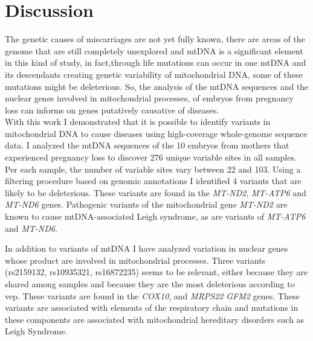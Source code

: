 \chapter{Discussion}
The genetic causes of miscarriages are not yet fully known, there are areas of the genome that are still completely unexplored and  mtDNA is a significant element in this kind of study, in fact,through life mutations can occur in one mtDNA and its descendants creating genetic variability of mitochondrial DNA, some of these mutations might be deleterious. So, the analysis of the mtDNA sequences and the nuclear genes involved in mitochondrial processes, of embryos from pregnancy loss can informs on genes putatively causative of diseases. \\

With this work I demonstrated that it is possible to identify variants in mitochondrial DNA to cause diseases using high-coverage whole-genome sequence data.
I analyzed the mtDNA sequences of the 10 embryos from mothers that experienced pregnancy loss to discover 276 unique variable sites in all samples. Per each sample, the number of variable sites vary between 22 and 103. Using a filtering procedure  based on genomic annotations I identified 4 variants that are likely to be deleterious. These variants are found in the \textit {MT-ND2}, \textit{MT-ATP6} and \textit{MT-ND6} genes. 
Pathogenic variants of the mitochondrial gene \textit{MT-ND2} are known to cause mtDNA-associated Leigh syndrome, as are variants of \textit{MT-ATP6} and \textit{MT-ND6}. 

In addition to variants of mtDNA I have analyzed variation in nuclear genes whose product are involved in mitochondrial processes. Three variants (rs2159132, rs10935321, rs16872235) seems to be relevant, either because they are shared among samples and because they are
the most deleterious according to vep. These variants are found in the \textit{COX10}, and \textit{MRPS22} \textit{GFM2} genes. These variants are associated with elements of the respiratory chain and mutations in these components are associated with mitochondrial hereditary disorders such as Leigh Syndrome.\\

